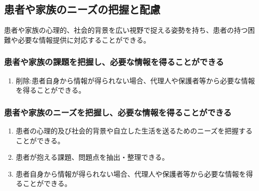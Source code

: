 \hypertarget{ux60a3ux8005ux3084ux5bb6ux65cfux306eux30cbux30fcux30baux306eux628aux63e1ux3068ux914dux616e}{%
\subsection{患者や家族のニーズの把握と配慮}\label{ux60a3ux8005ux3084ux5bb6ux65cfux306eux30cbux30fcux30baux306eux628aux63e1ux3068ux914dux616e}}

患者や家族の心理的、社会的背景を広い視野で捉える姿勢を持ち、患者の持つ困難や必要な情報提供に対応することができる。

\hypertarget{ux60a3ux8005ux3084ux5bb6ux65cfux306eux8ab2ux984cux3092ux628aux63e1ux3057ux5fc5ux8981ux306aux60c5ux5831ux3092ux5f97ux308bux3053ux3068ux304cux3067ux304dux308b}{%
\subsubsection{患者や家族の課題を把握し、必要な情報を得ることができる}\label{ux60a3ux8005ux3084ux5bb6ux65cfux306eux8ab2ux984cux3092ux628aux63e1ux3057ux5fc5ux8981ux306aux60c5ux5831ux3092ux5f97ux308bux3053ux3068ux304cux3067ux304dux308b}}

\begin{enumerate}
\def\labelenumi{\arabic{enumi}.}
\tightlist
\item
  削除:患者自身から情報が得られない場合、代理人や保護者等から必要な情報を得ることができる。
\end{enumerate}

\hypertarget{ux60a3ux8005ux3084ux5bb6ux65cfux306eux30cbux30fcux30baux3092ux628aux63e1ux3057ux5fc5ux8981ux306aux60c5ux5831ux3092ux5f97ux308bux3053ux3068ux304cux3067ux304dux308b}{%
\subsubsection{患者や家族のニーズを把握し、必要な情報を得ることができる}\label{ux60a3ux8005ux3084ux5bb6ux65cfux306eux30cbux30fcux30baux3092ux628aux63e1ux3057ux5fc5ux8981ux306aux60c5ux5831ux3092ux5f97ux308bux3053ux3068ux304cux3067ux304dux308b}}

\begin{enumerate}
\def\labelenumi{\arabic{enumi}.}
\tightlist
\item
  患者の心理的及び社会的背景や自立した生活を送るためのニーズを把握することができる。
\item
  患者が抱える課題、問題点を抽出・整理できる。
\item
  患者自身から情報が得られない場合、代理人や保護者等から必要な情報を得ることができる。
\end{enumerate}

